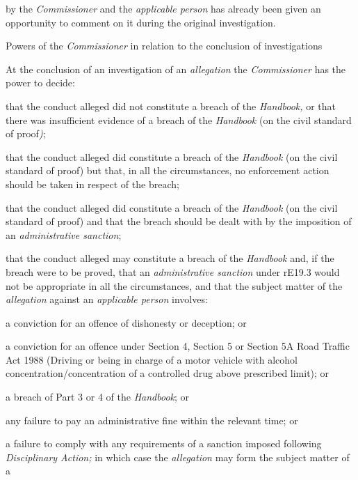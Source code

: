 by the \emph{Commissioner} and the \emph{applicable person} has already
been given an opportunity to comment on it during the original
investigation.\\
\par
Powers of the \emph{Commissioner} in relation to the conclusion of
investigations\\
\par
At the conclusion of an investigation of
an \emph{allegation} the \emph{Commissioner} has the power to decide:\\\nl \item that the conduct alleged did not constitute a breach of
the \emph{Handbook,} or that there was insufficient evidence of a breach
of the \emph{Handbook} (on the civil standard of proof\emph{)};
\item that the conduct alleged did constitute a breach of
the \emph{Handbook} (on the civil standard of proof) but that, in all
the circumstances, no enforcement action should be taken in respect of
the breach;
\item that the conduct alleged did constitute a breach of
the \emph{Handbook} (on the civil standard of proof) and that the breach
should be dealt with by the imposition of an \emph{administrative
sanction};
\item that the conduct alleged may constitute a breach of
the \emph{Handbook} and, if the breach were to be proved, that
an \emph{administrative sanction} under rE19.3 would not be appropriate
in all the circumstances, and that the subject matter of
the \emph{allegation} against an \emph{applicable person} involves:\\
\al
\item a conviction for an offence of dishonesty or deception; or\item a conviction for an offence under Section 4, Section 5 or Section 5A
Road Traffic Act 1988 (Driving or being in charge of a motor vehicle
with alcohol concentration/concentration of a controlled drug above
prescribed limit); or\item a breach of Part 3 or 4 of the \emph{Handbook}; or\item any failure to pay an administrative fine within the relevant time;
or\item a failure to comply with any requirements of a sanction imposed
following \emph{Disciplinary Action;}\la
in which case the \emph{allegation} may form the subject matter of a
